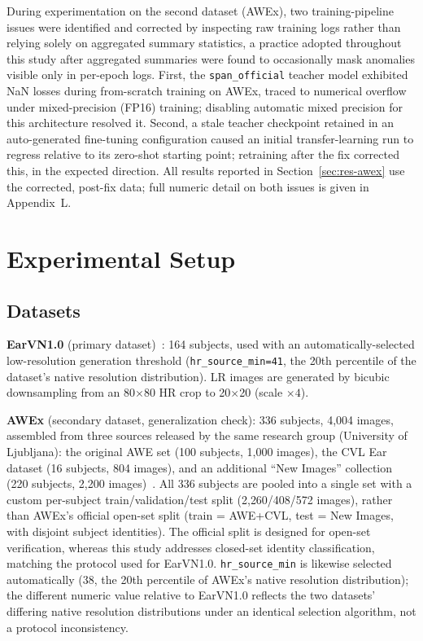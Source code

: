 \documentclass[pdflatex,sn-vancouver-num]{sn-jnl}
\begin{document}
During experimentation on the second dataset (AWEx), two training-pipeline issues were identified and corrected by inspecting raw training logs rather than relying solely on aggregated summary statistics, a practice adopted throughout this study after aggregated summaries were found to occasionally mask anomalies visible only in per-epoch logs. First, the \texttt{span\_official} teacher model exhibited NaN losses during from-scratch training on AWEx, traced to numerical overflow under mixed-precision (FP16) training; disabling automatic mixed precision for this architecture resolved it. Second, a stale teacher checkpoint retained in an auto-generated fine-tuning configuration caused an initial transfer-learning run to regress relative to its zero-shot starting point; retraining after the fix corrected this, in the expected direction. All results reported in Section~\ref{sec:res-awex} use the corrected, post-fix data; full numeric detail on both issues is given in Appendix~L.

\section{Experimental Setup}
\label{sec:setup}

\subsection{Datasets}
\label{sec:datasets}

\textbf{EarVN1.0} (primary dataset)~\cite{hoang2019earvn}: 164 subjects, used with an automatically-selected low-resolution generation threshold (\texttt{hr\_source\_min=41}, the 20th percentile of the dataset's native resolution distribution). LR images are generated by bicubic downsampling from an 80$\times$80 HR crop to 20$\times$20 (scale $\times4$).

\textbf{AWEx} (secondary dataset, generalization check): 336 subjects, 4{,}004 images, assembled from three sources released by the same research group (University of Ljubljana): the original AWE set (100 subjects, 1{,}000 images), the CVL Ear dataset (16 subjects, 804 images), and an additional ``New Images'' collection (220 subjects, 2{,}200 images)~\cite{emersic2017ear}. All 336 subjects are pooled into a single set with a custom per-subject train/validation/test split (2{,}260/408/572 images), rather than AWEx's official open-set split (train = AWE+CVL, test = New Images, with disjoint subject identities). The official split is designed for open-set verification, whereas this study addresses closed-set identity classification, matching the protocol used for EarVN1.0. \texttt{hr\_source\_min} is likewise selected automatically (38, the 20th percentile of AWEx's native resolution distribution); the different numeric value relative to EarVN1.0 reflects the two datasets' differing native resolution distributions under an identical selection algorithm, not a protocol inconsistency.
\end{document}
